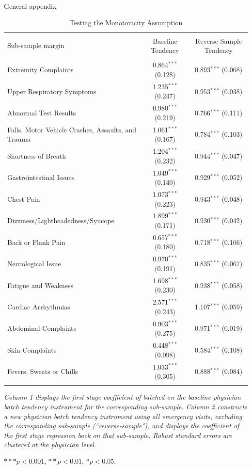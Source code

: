 \documentclass[,,nonblindrev]{informs}
\begin{document}
\begin{APPENDIX}{General appendix}
\begin{table}[!htbp]
\centering 
  \caption{Testing the Monotonicity Assumption} 
\label{tab:monotonicity}
\begin{tabular}{@{\extracolsep{5.5pt}}lcc} 
\\[-1.8ex]\hline 
\hline \\[-1.8ex] 
Sub-sample margin & Baseline Tendency  & Reverse-Sample Tendency \\ 
\hline \\[-1.8ex] 
Extremity Complaints & 0.864$^{***}$ (0.128) & 0.893$^{***}$ (0.068) \\ 
Upper Respiratory Symptoms & 1.235$^{***}$ (0.247) & 0.953$^{***}$ (0.038) \\ 
Abnormal Test Results & 0.980$^{***}$ (0.219) & 0.766$^{***}$ (0.111) \\
Falls, Motor Vehicle Crashes, Assaults, and Trauma & 1.061$^{***}$ (0.167) & 0.784$^{***}$ (0.103) \\
Shortness of Breath & 1.204$^{***}$ (0.232) & 0.944$^{***}$ (0.047) \\
Gastrointestinal Issues & 1.049$^{***}$ (0.140) & 0.929$^{***}$ (0.052) \\
Chest Pain & 1.073$^{***}$ (0.223) & 0.943$^{***}$ (0.048) \\
Dizziness/Lightheadedness/Syncope & 1.899$^{***}$ (0.171) & 0.930$^{***}$ (0.042) \\
Back or Flank Pain & 0.657$^{***}$ (0.180) & 0.718$^{***}$ (0.106) \\
Neurological Issue & 0.970$^{***}$ (0.191) & 0.835$^{***}$ (0.067) \\
Fatigue and Weakness & 1.698$^{***}$ (0.230) & 0.938$^{***}$ (0.058) \\
Cardiac Arrhythmias & 2.571$^{***}$ (0.243) & 1.107$^{***}$ (0.059) \\
Abdominal Complaints & 0.903$^{***}$ (0.275) & 0.971$^{***}$ (0.019) \\
Skin Complaints & 0.448$^{***}$ (0.098) & 0.584$^{***}$ (0.108) \\
Fevers, Sweats or Chills & 1.033$^{***}$ (0.305) & 0.888$^{***}$ (0.084) \\
\hline \\[-1.8ex] 
\end{tabular} 
\begin{tablenotes}
\tiny
\item \textit{Column 1 displays the first stage coefficient of batched on the baseline physician batch tendency instrument for the corresponding sub-sample. Column 2 constructs a new physician batch tendency instrument using all emergency visits, excluding the corresponding sub-sample (``reverse-sample"), and displays the coefficient of the first stage regression back on that sub-sample. Robust standard errors are clustered at the physician level.}
\item $*** p < 0.001$, $** p < 0.01$, $* p < 0.05$.
\end{tablenotes}
\end{table}


\end{APPENDIX}
\end{document}
